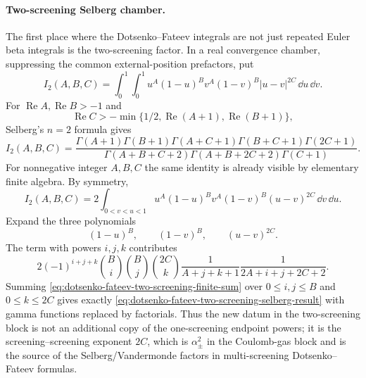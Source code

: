 \paragraph{Two-screening Selberg chamber.}
The first place where the Dotsenko--Fateev integrals are not just repeated
Euler beta integrals is the two-screening factor.  In a real convergence
chamber, suppressing the common external-position prefactors, put
\begin{equation}
  I_2(A,B,C)
  =
  \int_0^1\!\!\int_0^1
  u^A(1-u)^Bv^A(1-v)^B|u-v|^{2C}\,\dd u\,\dd v .
  \label{eq:dotsenko-fateev-two-screening-selberg-integral}
\end{equation}
For \(\operatorname{Re}A,\operatorname{Re}B>-1\) and
\[
  \operatorname{Re}C
  >
  -\min\{1/2,\operatorname{Re}(A+1),\operatorname{Re}(B+1)\},
\]
Selberg's \(n=2\) formula gives
\begin{equation}
  I_2(A,B,C)
  =
  \frac{
    \Gamma(A+1)\Gamma(B+1)
    \Gamma(A+C+1)\Gamma(B+C+1)\Gamma(2C+1)
  }{
    \Gamma(A+B+C+2)
    \Gamma(A+B+2C+2)
    \Gamma(C+1)
  } .
  \label{eq:dotsenko-fateev-two-screening-selberg-result}
\end{equation}
For nonnegative integer \(A,B,C\) the same identity is already visible by
elementary finite algebra.  By symmetry,
\[
  I_2(A,B,C)
  =
  2\int_{0<v<u<1}
  u^A(1-u)^Bv^A(1-v)^B(u-v)^{2C}\,\dd v\,\dd u .
\]
Expand the three polynomials
\[
  (1-u)^B,\qquad (1-v)^B,\qquad (u-v)^{2C}.
\]
The term with powers \(i,j,k\) contributes
\begin{equation}
  2(-1)^{i+j+k}
  \binom{B}{i}\binom{B}{j}\binom{2C}{k}
  \frac{1}{A+j+k+1}
  \frac{1}{2A+i+j+2C+2}.
  \label{eq:dotsenko-fateev-two-screening-finite-sum}
\end{equation}
Summing \eqref{eq:dotsenko-fateev-two-screening-finite-sum} over
\(0\le i,j\le B\) and \(0\le k\le2C\) gives exactly
\eqref{eq:dotsenko-fateev-two-screening-selberg-result} with gamma functions
replaced by factorials.  Thus the new datum in the two-screening block is
not an additional copy of the one-screening endpoint powers; it is the
screening--screening exponent \(2C\), which is \(\alpha_\pm^2\) in the
Coulomb-gas block and is the source of the Selberg/Vandermonde factors in
multi-screening Dotsenko--Fateev formulas.

